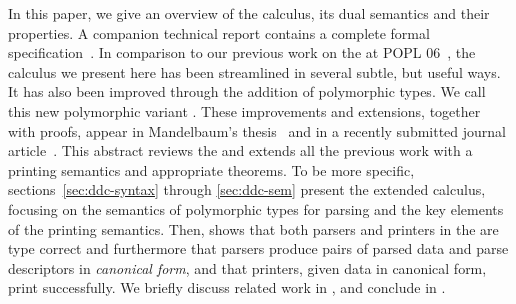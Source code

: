 In this paper, we give an overview of the calculus, its dual semantics
and their properties.  A companion technical report contains a
complete formal specification~\cite{fisher+:popl-sub-long}.  In
comparison to our previous work on the \ddcold{} at POPL
06~\cite{fisher+:next700ddl}, the calculus we present here has been
streamlined in several subtle, but useful ways.  It has also been
improved through the addition of polymorphic types.  We call this new
polymorphic variant \ddc{}.  These improvements and extensions,
together with proofs, appear in Mandelbaum's
thesis~\cite{mandelbaum:thesis} and in a recently submitted journal
article~\cite{fisher+:ddcjournal}.  This abstract reviews the \ddc{}
and extends all the previous work with a printing semantics and
appropriate theorems.  To be more specific,
sections~\ref{sec:ddc-syntax} through \ref{sec:ddc-sem} present the
extended \ddc{} calculus, focusing on the semantics of polymorphic
types for parsing and the key elements of the printing semantics.
Then,  shows that both parsers and printers in
the \ddc{} are type correct and furthermore that parsers produce pairs
of parsed data and parse descriptors in {\em canonical form}, and that
printers, given data in canonical form, print successfully. We briefly
discuss related work in , and conclude in
.

